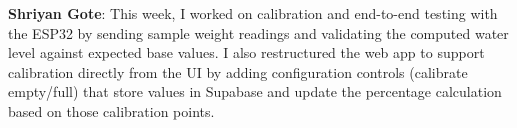 \documentclass[12pt]{article}
\begin{document}
\noindent\textbf{Shriyan Gote}:
\noindent This week, I worked on calibration and end-to-end testing with the ESP32 by sending sample weight readings and validating 
the computed water level against expected base values. I also restructured the web app to support calibration directly from the UI 
by adding configuration controls (calibrate empty/full) that store values in Supabase and update the percentage calculation based on 
those calibration points.\\
\end{document}
